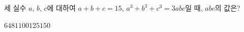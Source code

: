 세 실수 $a$, $b$, $c$에 대하여 $a+b+c=15$, $a^3+b^3+c^3=3abc$일 때, $abc$의 값은?
\begin{choices32}{$64$}{$81$}{$100$}{$125$}{$150$}\end{choices32}
